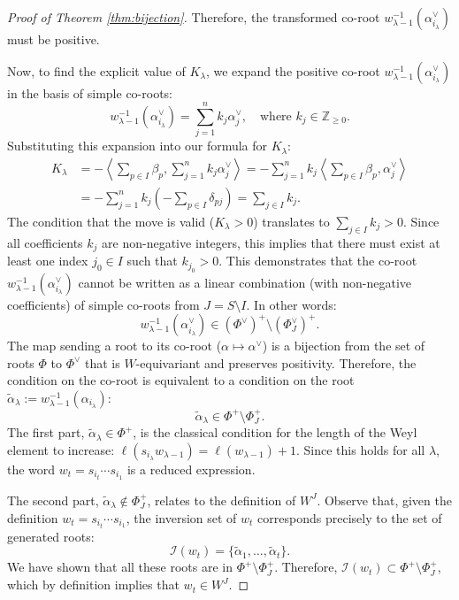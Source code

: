 \documentclass[11pt,a4paper]{amsart}
\theoremstyle{plain}
\theoremstyle{definition}
\theoremstyle{remark}
\begin{document}
\begin{proof}[Proof of Theorem \ref{thm:bijection}]
    Therefore, the transformed co-root $w_{\lambda-1}^{-1}(\alpha_{i_\lambda}^\vee)$ must be positive.

    Now, to find the explicit value of $K_\lambda$, we expand the positive co-root $w_{\lambda-1}^{-1}(\alpha_{i_\lambda}^\vee)$ in the basis of simple co-roots:
    \[
    w_{\lambda-1}^{-1}(\alpha_{i_\lambda}^\vee) = \sum_{j=1}^n k_j \alpha_j^\vee, \quad \text{where } k_j \in \mathbb{Z}_{\ge 0}.
    \]
    Substituting this expansion into our formula for $K_\lambda$:
    \begin{align*}
        K_\lambda &= -\left\langle \sum_{p \in I} \beta_p, \sum_{j=1}^n k_j \alpha_j^\vee \right\rangle = -\sum_{j=1}^n k_j \left\langle \sum_{p \in I} \beta_p, \alpha_j^\vee \right\rangle \\
        &= -\sum_{j=1}^n k_j \left( -\sum_{p \in I} \delta_{pj} \right) = \sum_{j \in I} k_j.
    \end{align*}
    The condition that the move is valid ($K_\lambda > 0$) translates to $\sum_{j \in I} k_j > 0$. Since all coefficients $k_j$ are non-negative integers, this implies that there must exist at least one index $j_0 \in I$ such that $k_{j_0} > 0$. This demonstrates that the co-root $w_{\lambda-1}^{-1}(\alpha_{i_\lambda}^\vee)$ cannot be written as a linear combination (with non-negative coefficients) of simple co-roots from $J=S\setminus I$. In other words:
    \[
    w_{\lambda-1}^{-1}(\alpha_{i_\lambda}^\vee) \in (\Phi^\vee)^+ \setminus (\Phi_J^\vee)^+.
    \]
    The map sending a root to its co-root ($\alpha \mapsto \alpha^\vee$) is a bijection from the set of roots $\Phi$ to $\Phi^\vee$ that is $W$-equivariant and preserves positivity. Therefore, the condition on the co-root is equivalent to a condition on the root $\tilde{\alpha}_\lambda := w_{\lambda-1}^{-1}(\alpha_{i_\lambda})$:
    \[
    \tilde{\alpha}_\lambda \in \Phi^+ \setminus \Phi_J^+.
    \]
    The first part, $\tilde{\alpha}_\lambda \in \Phi^+$, is the classical condition for the length of the Weyl element to increase: $\ell(s_{i_\lambda}w_{\lambda-1}) = \ell(w_{\lambda-1}) + 1$. Since this holds for all $\lambda$, the word $w_t = s_{i_t}\cdots s_{i_1}$ is a reduced expression.

    The second part, $\tilde{\alpha}_\lambda \notin \Phi_J^+$, relates to the definition of $W^J$. Observe that, given the definition $w_t = s_{i_t}\cdots s_{i_1}$, the inversion set of $w_t$ corresponds precisely to the set of generated roots:
    \[
    \mathcal{I}(w_t) = \{\tilde{\alpha}_1, \dots, \tilde{\alpha}_t\}.
    \]
    We have shown that all these roots are in $\Phi^+ \setminus \Phi_J^+$. Therefore, $\mathcal{I}(w_t) \subset \Phi^+ \setminus \Phi_J^+$, which by definition implies that $w_t \in W^J$.


\end{proof}
\end{document}
